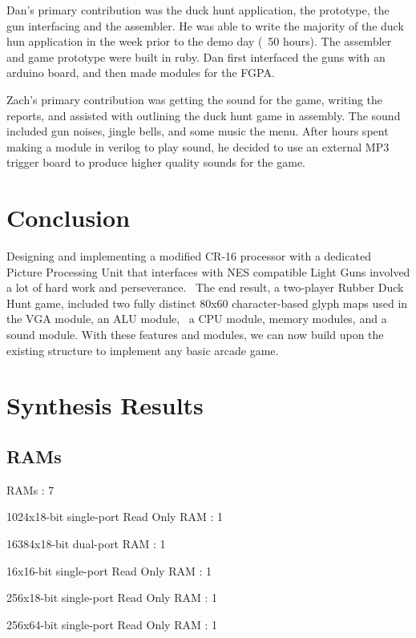 \documentclass[letterpaper, 11 pt, conference]{article}
\begin{document}
Dan’s primary contribution was the duck hunt application, the prototype, the gun interfacing and the assembler. He was able to write the majority of the duck hun application in the week prior to the demo day (~50 hours). The assembler and game prototype were built in ruby. Dan first interfaced the guns with an arduino board, and then made modules for the FGPA. 

Zach’s primary contribution was getting the sound for the game, writing the reports, and assisted with outlining the duck hunt game in assembly. The sound included gun noises, jingle bells, and some music the menu. After hours spent making a module in verilog to play sound, he decided to use an external MP3 trigger board to produce higher quality sounds for the game.

\section{Conclusion}
Designing and implementing a modified CR-16 processor with a dedicated Picture Processing Unit that interfaces with NES compatible Light Guns involved a lot of hard work and perseverance.  The end result, a two-player Rubber Duck Hunt game, included two fully distinct 80x60 character-based glyph maps used in the VGA module, an ALU module,  a CPU module, memory modules, and a sound module. With these features and modules, we can now build upon the existing structure to implement any basic arcade game.



\newpage
\appendixname
\appendix
\section{Synthesis Results}

\subsection{RAMs}
 RAMs                                                 : 7

 1024x18-bit single-port Read Only RAM                 : 1

 16384x18-bit dual-port RAM                            : 1

 16x16-bit single-port Read Only RAM                   : 1

 256x18-bit single-port Read Only RAM                  : 1

 256x64-bit single-port Read Only RAM                  : 1
\end{document}
